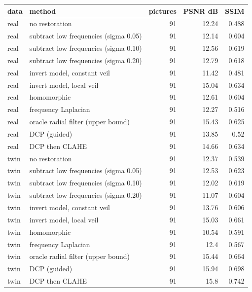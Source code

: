 \begin{tabular}{llrrr}
\toprule
data & method & pictures & PSNR dB & SSIM \\
\midrule
real & no restoration & 91 & 12.24 & 0.488 \\
real & subtract low frequencies (sigma 0.05) & 91 & 12.14 & 0.604 \\
real & subtract low frequencies (sigma 0.10) & 91 & 12.56 & 0.619 \\
real & subtract low frequencies (sigma 0.20) & 91 & 12.79 & 0.618 \\
real & invert model, constant veil & 91 & 11.42 & 0.481 \\
real & invert model, local veil & 91 & 15.04 & 0.634 \\
real & homomorphic & 91 & 12.61 & 0.604 \\
real & frequency Laplacian & 91 & 12.27 & 0.516 \\
real & oracle radial filter (upper bound) & 91 & 15.43 & 0.625 \\
real & DCP (guided) & 91 & 13.85 & 0.52 \\
real & DCP then CLAHE & 91 & 14.66 & 0.634 \\
twin & no restoration & 91 & 12.37 & 0.539 \\
twin & subtract low frequencies (sigma 0.05) & 91 & 12.53 & 0.623 \\
twin & subtract low frequencies (sigma 0.10) & 91 & 12.02 & 0.619 \\
twin & subtract low frequencies (sigma 0.20) & 91 & 11.07 & 0.604 \\
twin & invert model, constant veil & 91 & 13.76 & 0.606 \\
twin & invert model, local veil & 91 & 15.03 & 0.661 \\
twin & homomorphic & 91 & 10.54 & 0.591 \\
twin & frequency Laplacian & 91 & 12.4 & 0.567 \\
twin & oracle radial filter (upper bound) & 91 & 15.44 & 0.664 \\
twin & DCP (guided) & 91 & 15.94 & 0.698 \\
twin & DCP then CLAHE & 91 & 15.8 & 0.742 \\
\bottomrule
\end{tabular}
